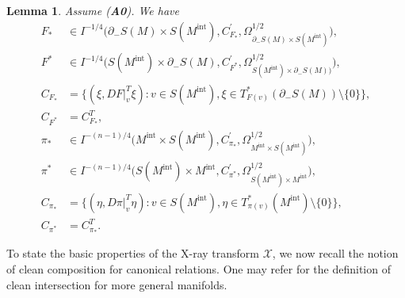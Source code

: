 \documentclass[a4paper,11pt,reqno]{amsart}
\numberwithin{equation}{section}
\newtheorem{lemma}[theorem]{Lemma}
\theoremstyle{definition}
\theoremstyle{remark}
\begin{document}
\begin{lemma}
\label{theorem:Fpi}
Assume {\rm ({\bf A0})}. 
We have 
%
%
\begin{align*}
  F_\ast
& \in 
  I^{-1/4}\bigl(\partial_-S(M){\times}S(M^\text{int}),C_{F_\ast}^\prime,\Omega_{\partial_-S(M){\times}S(M^\text{int})}^{1/2}\bigr),
\\
  F^\ast
& \in 
  I^{-1/4}\bigl(S(M^\text{int}){\times}\partial_-S(M),C_{F^\ast}^\prime,\Omega_{S(M^\text{int})\times\partial_-S(M))}^{1/2}\bigr),
\\
  C_{F_\ast}
& =
  \bigl\{
  (\xi,DF\vert^T_v\xi)
  : 
  v \in S(M^\text{int}), 
  \xi \in T^\ast_{F(v)}(\partial_-S(M))\setminus\{0\}
  \bigr\},
\\
  C_{F^\ast}
& =
  C_{F_\ast}^T,
\\
  \pi_\ast
& \in 
  I^{-(n-1)/4}\bigl(M^\text{int}{\times}S(M^\text{int}),C_{\pi_\ast}^\prime,\Omega_{M^\text{int}{\times}S(M^\text{int})}^{1/2}\bigr),
\\
  \pi^\ast
& \in 
  I^{-(n-1)/4}\bigl(S(M^\text{int}){\times}M^\text{int},C_{\pi^\ast}^\prime,\Omega_{S(M^\text{int}){\times}M^\text{int}}^{1/2}\bigr),
\\
  C_{\pi_\ast}
& =
  \bigl\{
  (\eta,D\pi\vert^T_v\eta)
  :
  v \in S(M^\text{int}), 
  \eta \in T^\ast_{\pi(v)}(M^\text{int})\setminus\{0\}
  \bigr\},
\\
  C_{\pi^\ast}
& =
  C_{\pi_\ast}^T.
\end{align*}
%
% 
\end{lemma} 
%
%
To state the basic properties of the X-ray transform $\mathcal{X}$, 
we now recall the notion of clean composition for canonical relations. 
One may refer \cite[page~490, Appendix~C.3]{Hoermander3} for the definition of clean intersection for more general manifolds.  
%
%
\end{document}
